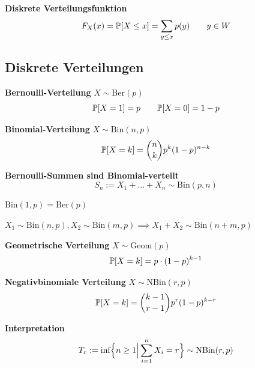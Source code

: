 \theorem \textbf{Diskrete Verteilungsfunktion}
$$
    F_X(x) = \P[X \leq x] = \sum_{y \leq x} p(y) \qquad y \in W
$$

\newpage

\subsection{Diskrete Verteilungen}

 \textbf{Bernoulli-Verteilung} $X \sim \text{Ber}(p)$\\
$$
    \P[X=1] = p \qquad \P[X=0] = 1-p
$$

 \textbf{Binomial-Verteilung} $X \sim \text{Bin}(n,p)$\\
$$
    \P[X=k] = \binom{n}{k}p^k(1-p)^{n-k}
$$

\theorem \textbf{Bernoulli-Summen sind Binomial-verteilt}
$$
    S_n := X_1 + \ldots + X_n \sim \text{Bin}(p, n)
$$

\scriptsize
\lemma $\text{Bin}(1,p) = \text{Ber}(p)$

\lemma $X_1 \sim \text{Bin}(n, p), X_2 \sim \text{Bin}(m, p) \implies X_1 + X_2 \sim \text{Bin}(n+m,p)$

\normalsize

 \textbf{Geometrische Verteilung} $X \sim \text{Geom}(p)$\\
$$
    \P[X=k] = p\cdot(1-p)^{k-1}
$$

 \textbf{Negativbinomiale Verteilung} $X \sim \text{NBin}(r,p)$\\
$$
    \P[X = k] = \binom{k-1}{r-1}p^r(1-p)^{k-r}
$$

\theorem \textbf{Interpretation}\\
$$
    T_r := \text{inf}\Bigl\{ n \geq 1 \Big| \sum_{i=1}^{n}X_i=r \Bigr\} \sim \text{NBin}(r,p)
$$

\scriptsize

